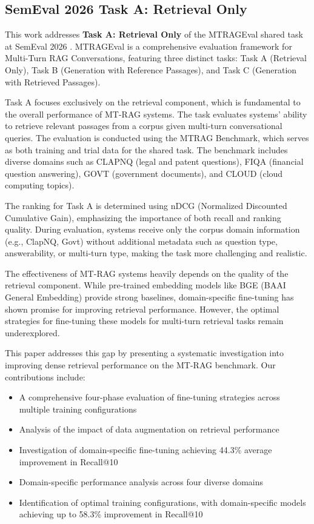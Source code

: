 \documentclass[conference]{IEEEtran}
\begin{document}
\subsection{SemEval 2026 Task A: Retrieval Only}

This work addresses \textbf{Task A: Retrieval Only} of the MTRAGEval shared task at SemEval 2026 \cite{mtreval2026}. MTRAGEval is a comprehensive evaluation framework for Multi-Turn RAG Conversations, featuring three distinct tasks: Task A (Retrieval Only), Task B (Generation with Reference Passages), and Task C (Generation with Retrieved Passages). 

Task A focuses exclusively on the retrieval component, which is fundamental to the overall performance of MT-RAG systems. The task evaluates systems' ability to retrieve relevant passages from a corpus given multi-turn conversational queries. The evaluation is conducted using the MTRAG Benchmark, which serves as both training and trial data for the shared task. The benchmark includes diverse domains such as CLAPNQ (legal and patent questions), FIQA (financial question answering), GOVT (government documents), and CLOUD (cloud computing topics).

The ranking for Task A is determined using nDCG (Normalized Discounted Cumulative Gain), emphasizing the importance of both recall and ranking quality. During evaluation, systems receive only the corpus domain information (e.g., ClapNQ, Govt) without additional metadata such as question type, answerability, or multi-turn type, making the task more challenging and realistic.

The effectiveness of MT-RAG systems heavily depends on the quality of the retrieval component. While pre-trained embedding models like BGE (BAAI General Embedding) provide strong baselines, domain-specific fine-tuning has shown promise for improving retrieval performance. However, the optimal strategies for fine-tuning these models for multi-turn retrieval tasks remain underexplored.

This paper addresses this gap by presenting a systematic investigation into improving dense retrieval performance on the MT-RAG benchmark. Our contributions include:

\begin{itemize}
    \item A comprehensive four-phase evaluation of fine-tuning strategies across multiple training configurations
    \item Analysis of the impact of data augmentation on retrieval performance
    \item Investigation of domain-specific fine-tuning achieving 44.3\% average improvement in Recall@10
    \item Domain-specific performance analysis across four diverse domains
    \item Identification of optimal training configurations, with domain-specific models achieving up to 58.3\% improvement in Recall@10
\end{itemize}
\end{document}
